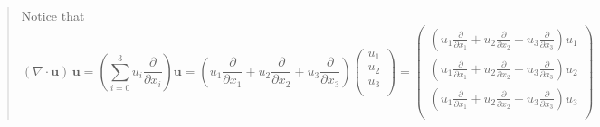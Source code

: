 \begin{quote}
	Notice that
\begin{equation}
\left(\nabla\cdot \textbf{u}\right)\,\textbf{u} = \left(\sum_{i=0}^{3}u_i\frac{\partial}{\partial x_i}\right)\textbf{u}
= \left(u_1\frac{\partial}{\partial x_1}
+u_2\frac{\partial}{\partial x_2}
+u_3\frac{\partial}{\partial x_3}\right)
\begin{pmatrix}u_1\\ u_2\\ u_3\\
\end{pmatrix}
=\begin{pmatrix}
\left(u_1\frac{\partial}{\partial x_1}
+u_2\frac{\partial}{\partial x_2}
+u_3\frac{\partial}{\partial x_3}\right) u_1\\
\left(u_1\frac{\partial}{\partial x_1}
+u_2\frac{\partial}{\partial x_2}
+u_3\frac{\partial}{\partial x_3}\right) u_2\\
\left(u_1\frac{\partial}{\partial x_1}
+u_2\frac{\partial}{\partial x_2}
+u_3\frac{\partial}{\partial x_3}\right) u_3\\
\end{pmatrix}
\end{equation}

\end{quote}
